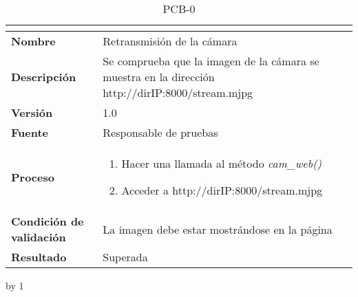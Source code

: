 \begin{table}[H]
	\caption{PCB-0\number\pcb}
	\begin{tabular}{|l|p{}|}
		\hline
		\multicolumn{2}{|c|}{\cellcolor[HTML]{BFBFBF}{\color[HTML]{000000} \textbf{PCB-0\number\pcb}}} \\ \hline
		\textbf{Nombre}                  & Retransmisión de la cámara                                                                       \\ \hline
		\textbf{Descripción}             & Se comprueba que la imagen de la cámara se muestra en la dirección http://dirIP:8000/stream.mjpg \\ \hline
		\textbf{Versión}                 & 1.0                                                                                              \\ \hline
		\textbf{Fuente}                  & Responsable de pruebas                                                                           \\ \hline
		\textbf{Proceso}                 & \begin{enumerate}
			\item Hacer una llamada al método \textit{cam\_web()}
			\item Acceder a http://dirIP:8000/stream.mjpg
		\end{enumerate}                                                                       \\ \hline
		\textbf{Condición de validación} & La imagen debe estar mostrándose en la página                                                    \\ \hline
		\textbf{Resultado}               & Superada                                                                                         \\ \hline
	\end{tabular}
\end{table}
\advance\pcb by 1
